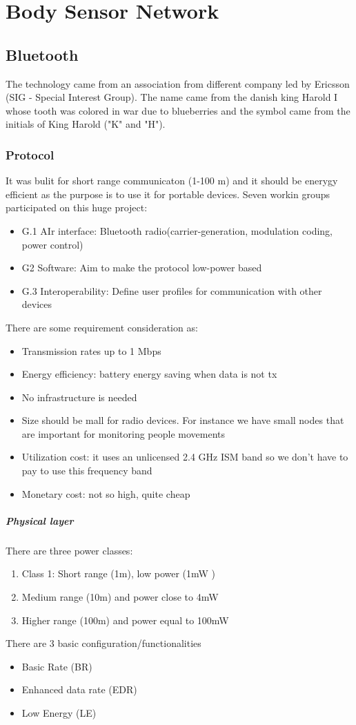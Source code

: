 \chapter{Body Sensor Network}
\section{Bluetooth}
The technology came from an association from different company led by Ericsson (SIG - Special Interest Group). The name came from the danish king Harold I whose tooth was colored in war due to blueberries and the symbol came from the initials of King Harold ("K" and "H"). 

\subsection{Protocol}
It was bulit for short range communicaton (1-100 m) and it should be enerygy efficient as the purpose is to use it for portable devices. Seven workin groups participated on this huge project:
\begin{itemize}
\item G.1 AIr interface: Bluetooth radio(carrier-generation, modulation coding, power control)
\item G2 Software: Aim to make the protocol low-power based
\item G.3 Interoperability: Define user profiles for communication with other devices
\end{itemize}
There are some requirement consideration as:
\begin{itemize}
\item Transmission rates up to 1 Mbps
\item Energy efficiency: battery energy saving when data is not tx
\item No infrastructure is needed
\item Size should be mall for radio devices. For instance we have small nodes that are important for monitoring people movements
\item Utilization cost: it uses an unlicensed 2.4 GHz ISM band so we don't have to pay to use this frequency band
\item Monetary cost: not so high, quite cheap
\end{itemize}

\paragraph{Physical layer}
There are three power classes:
\begin{enumerate}
\item Class 1: Short range (1m), low power (1mW )
\item Medium range (10m) and power close to 4mW
\item Higher range (100m) and power equal to 100mW
\end{enumerate}
There are 3 basic configuration/functionalities
\begin{itemize}
\item Basic Rate (BR)
\item Enhanced data rate (EDR)
\item Low Energy (LE)
\end{itemize}

